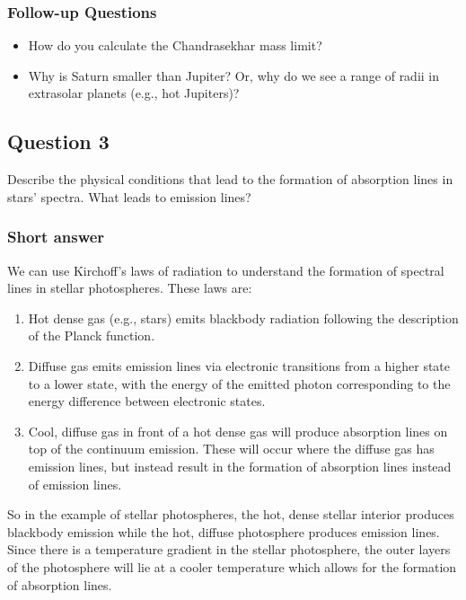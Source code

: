 \documentclass[a4paper,10pt]{article}
\begin{document}
\newpage
\subsubsection{Follow-up Questions}

\begin{itemize}
    \item How do you calculate the Chandrasekhar mass limit?
    \item Why is Saturn smaller than Jupiter? Or, why do we see a range of radii in extrasolar planets (e.g., hot Jupiters)?
\end{itemize}


\newpage
\subsection{Question 3}

Describe the physical conditions that lead to the formation of absorption lines in stars' spectra. What leads to emission lines?

\subsubsection{Short answer}

We can use Kirchoff's laws of radiation to understand the formation of spectral lines in stellar photospheres. These laws are:

\begin{enumerate}
    \item Hot dense gas (e.g., stars) emits blackbody radiation following the description of the Planck function.
    \item Diffuse gas emits emission lines via electronic transitions from a higher state to a lower state, with the energy of the emitted photon corresponding to the energy difference between electronic states.
    \item Cool, diffuse gas in front of a hot dense gas will produce absorption lines on top of the continuum emission. These will occur where the diffuse gas has emission lines, but instead result in the formation of absorption lines instead of emission lines.
\end{enumerate}

{\noindent}So in the example of stellar photospheres, the hot, dense stellar interior produces blackbody emission while the hot, diffuse photosphere produces emission lines. Since there is a temperature gradient in the stellar photosphere, the outer layers of the photosphere will lie at a cooler temperature which allows for the formation of absorption lines.
\end{document}
